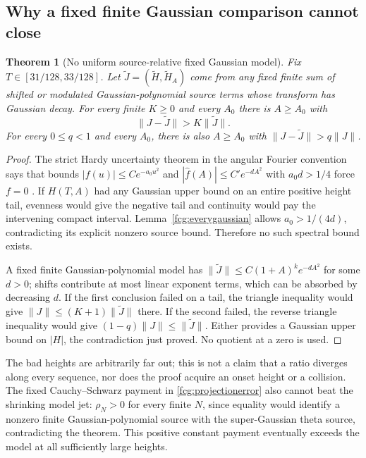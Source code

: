\documentclass[11pt]{article}
\numberwithin{equation}{section}
\newtheorem{theorem}{Theorem}[section]
\begin{document}
\subsection{Why a fixed finite Gaussian comparison cannot close}

\begin{theorem}[No uniform source-relative fixed Gaussian model]
\label{fcg:hardyobstruction}
Fix $T\in[31/128,33/128]$. Let $\widetilde J=(\widetilde H,
\widetilde H_A)$ come from any fixed finite sum of shifted or modulated
Gaussian-polynomial source terms whose transform has Gaussian decay.
For every finite $K\ge0$ and every $A_0$ there is $A\ge A_0$ with
\begin{equation}\label{fcg:relativefailure}
 \|J-\widetilde J\|>K\|\widetilde J\|.
\end{equation}
For every $0\le q<1$ and every $A_0$, there is also $A\ge A_0$ with
$\|J-\widetilde J\|>q\|J\|$.
\end{theorem}
\begin{proof}
The strict Hardy uncertainty theorem in the angular Fourier convention
says that bounds $|f(u)|\le Ce^{-a_0u^2}$ and
$|\widehat f(A)|\le C'e^{-dA^2}$ with $a_0d>1/4$ force $f=0$
\cite{HardyRevisited}. If $H(T,A)$ had any Gaussian upper bound on
an entire positive height tail, evenness would give the negative
tail and continuity would pay the intervening compact interval.
Lemma~\ref{fcg:everygaussian} allows $a_0>1/(4d)$, contradicting
its explicit nonzero source bound. Therefore no such spectral bound
exists.

A fixed finite Gaussian-polynomial model has
$\|\widetilde J\|\le C(1+A)^k e^{-dA^2}$ for some $d>0$;
shifts contribute at most linear exponent terms, which can be
absorbed by decreasing $d$. If the first conclusion failed on a
tail, the triangle inequality would give
$\|J\|\le(K+1)\|\widetilde J\|$ there. If the second failed,
the reverse triangle inequality would give
$(1-q)\|J\|\le\|\widetilde J\|$. Either provides a Gaussian
upper bound on $|H|$, the contradiction just proved. No quotient
at a zero is used.
\end{proof}

The bad heights are arbitrarily far out; this is not a claim that a
ratio diverges along every sequence, nor does the proof acquire an
onset height or a collision. The fixed Cauchy--Schwarz payment in
\eqref{fcg:projectionerror} also cannot beat the shrinking model jet:
$\rho_N>0$ for every finite $N$, since equality would identify a
nonzero finite Gaussian-polynomial source with the super-Gaussian
theta source, contradicting the theorem. This positive constant
payment eventually exceeds the model at all sufficiently large heights.
\end{document}
